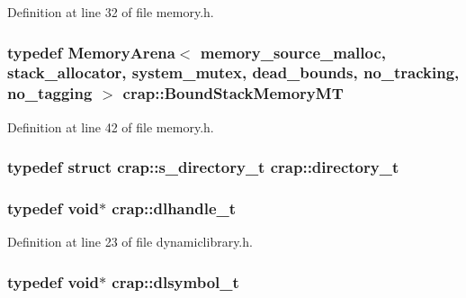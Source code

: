 Definition at line 32 of file memory.\+h.

\hypertarget{namespacecrap_a9e4f3d9be875850166fb480763ce7abb}{}
\subsubsection[{Bound\+Stack\+Memory\+M\+T}]{\setlength{\rightskip}{0pt plus 5cm}typedef {\bf Memory\+Arena}$<$ {\bf memory\+\_\+source\+\_\+malloc}, {\bf stack\+\_\+allocator}, {\bf system\+\_\+mutex}, {\bf dead\+\_\+bounds}, {\bf no\+\_\+tracking}, {\bf no\+\_\+tagging} $>$ {\bf crap\+::\+Bound\+Stack\+Memory\+M\+T}}\label{namespacecrap_a9e4f3d9be875850166fb480763ce7abb}


Definition at line 42 of file memory.\+h.

\hypertarget{namespacecrap_a82911918170604f7fc9e93d66891069c}{}
\subsubsection[{directory\+\_\+t}]{\setlength{\rightskip}{0pt plus 5cm}typedef struct {\bf crap\+::s\+\_\+directory\+\_\+t}
 {\bf crap\+::directory\+\_\+t}}\label{namespacecrap_a82911918170604f7fc9e93d66891069c}
\hypertarget{namespacecrap_acee8e66495f007816233ce6b2da6465b}{}
\subsubsection[{dlhandle\+\_\+t}]{\setlength{\rightskip}{0pt plus 5cm}typedef void$\ast$ {\bf crap\+::dlhandle\+\_\+t}}\label{namespacecrap_acee8e66495f007816233ce6b2da6465b}


Definition at line 23 of file dynamiclibrary.\+h.

\hypertarget{namespacecrap_a2eba1ed085b0da868a3cd8b2d6a4f7e7}{}
\subsubsection[{dlsymbol\+\_\+t}]{\setlength{\rightskip}{0pt plus 5cm}typedef void$\ast$ {\bf crap\+::dlsymbol\+\_\+t}}\label{namespacecrap_a2eba1ed085b0da868a3cd8b2d6a4f7e7}



